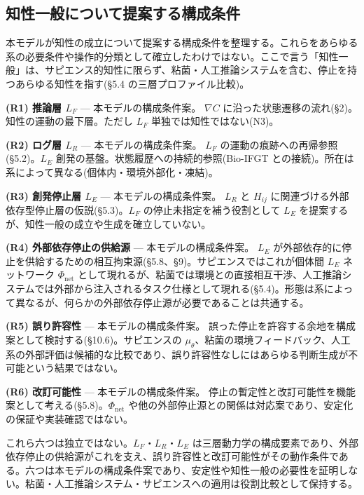 \bigskip


\subsection{知性一般について提案する構成条件}


本モデルが知性の成立について提案する構成条件を整理する。これらをあらゆる系の必要条件や操作的分類として確立したわけではない。ここで言う「知性一般」は、サピエンス的知性に限らず、粘菌・人工推論システムを含む、停止を持つあらゆる知性を指す(\S{}5.4 の三層プロファイル比較)。

\textbf{(R1) 推論層 $L_F$} — 本モデルの構成条件案。
$\nabla C$ に沿った状態遷移の流れ(\S{}2)。知性の運動の最下層。ただし $L_F$ 単独では知性ではない(N3)。

\textbf{(R2) ログ層 $L_R$} — 本モデルの構成条件案。
$L_F$ の運動の痕跡への再帰参照(\S{}5.2)。$L_E$ 創発の基盤。状態履歴への持続的参照(Bio-IFGT との接続)。所在は系によって異なる(個体内・環境外部化・凍結)。

\textbf{(R3) 創発停止層 $L_E$} — 本モデルの構成条件案。
$L_R$ と $H_{ij}$ に関連づける外部依存型停止層の仮説(\S{}5.3)。$L_F$ の停止未指定を補う役割として $L_E$ を提案するが、知性一般の成立や生成を確立していない。

\textbf{(R4) 外部依存停止の供給源} — 本モデルの構成条件案。
$L_E$ が外部依存的に停止を供給するための相互拘束源(\S{}5.8、\S{}9)。サピエンスではこれが個体間 $L_E$ ネットワーク $\Phi_{\text{net}}$ として現れるが、粘菌では環境との直接相互干渉、人工推論システムでは外部から注入されるタスク仕様として現れる(\S{}5.4)。形態は系によって異なるが、何らかの外部依存停止源が必要であることは共通する。

\textbf{(R5) 誤り許容性} — 本モデルの構成条件案。
誤った停止を許容する余地を構成案として検討する(\S{}10.6)。サピエンスの $\mu_\theta$、粘菌の環境フィードバック、人工系の外部評価は候補的な比較であり、誤り許容性なしにはあらゆる判断生成が不可能という結果ではない。

\textbf{(R6) 改訂可能性} — 本モデルの構成条件案。
停止の暫定性と改訂可能性を機能案として考える(\S{}5.8)。$\Phi_{\text{net}}$ や他の外部停止源との関係は対応案であり、安定化の保証や実装確認ではない。

これら六つは独立ではない。$L_F$・$L_R$・$L_E$ は三層動力学の構成要素であり、外部依存停止の供給源がこれを支え、誤り許容性と改訂可能性がその動作条件である。六つは本モデルの構成条件案であり、安定性や知性一般の必要性を証明しない。粘菌・人工推論システム・サピエンスへの適用は役割比較として保持する。

